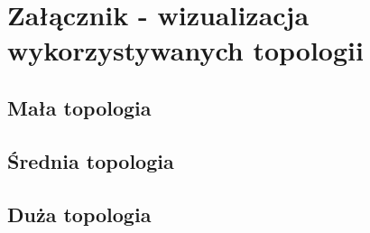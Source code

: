 \section{Załącznik - wizualizacja wykorzystywanych topologii}

\subsection{Mała topologia}
\begin{minipage}{\linewidth}%
\end{minipage}

\subsection{Średnia topologia}
\begin{minipage}{\linewidth}%
\end{minipage}

\subsection{Duża topologia}
\begin{minipage}{\linewidth}%
\end{minipage}
